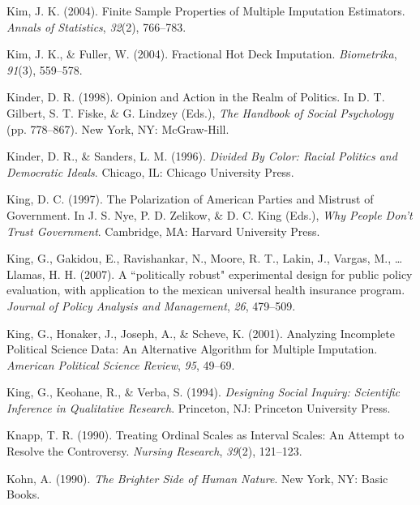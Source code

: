 \documentclass[12pt,econ]{sources/authesis}
\begin{document}
\leavevmode\hypertarget{ref-kim_2004_finite}{}%
Kim, J. K. (2004). Finite Sample Properties of Multiple Imputation Estimators. \emph{Annals of Statistics}, \emph{32}(2), 766--783.

\leavevmode\hypertarget{ref-kim_2004_fractional}{}%
Kim, J. K., \& Fuller, W. (2004). Fractional Hot Deck Imputation. \emph{Biometrika}, \emph{91}(3), 559--578.

\leavevmode\hypertarget{ref-kinder_1998_opinion}{}%
Kinder, D. R. (1998). Opinion and Action in the Realm of Politics. In D. T. Gilbert, S. T. Fiske, \& G. Lindzey (Eds.), \emph{The Handbook of Social Psychology} (pp. 778--867). New York, NY: McGraw-Hill.

\leavevmode\hypertarget{ref-kinder_1996_divided}{}%
Kinder, D. R., \& Sanders, L. M. (1996). \emph{Divided By Color: Racial Politics and Democratic Ideals}. Chicago, IL: Chicago University Press.

\leavevmode\hypertarget{ref-king_polarization_1997}{}%
King, D. C. (1997). The Polarization of American Parties and Mistrust of Government. In J. S. Nye, P. D. Zelikow, \& D. C. King (Eds.), \emph{Why People Don't Trust Government}. Cambridge, MA: Harvard University Press.

\leavevmode\hypertarget{ref-king_a-politically_2007}{}%
King, G., Gakidou, E., Ravishankar, N., Moore, R. T., Lakin, J., Vargas, M., \ldots{} Llamas, H. H. (2007). A ``politically robust" experimental design for public policy evaluation, with application to the mexican universal health insurance program. \emph{Journal of Policy Analysis and Management}, \emph{26}, 479--509.

\leavevmode\hypertarget{ref-king_2001_analyzing}{}%
King, G., Honaker, J., Joseph, A., \& Scheve, K. (2001). Analyzing Incomplete Political Science Data: An Alternative Algorithm for Multiple Imputation. \emph{American Political Science Review}, \emph{95}, 49--69.

\leavevmode\hypertarget{ref-king_designing_1994}{}%
King, G., Keohane, R., \& Verba, S. (1994). \emph{Designing Social Inquiry: Scientific Inference in Qualitative Research}. Princeton, NJ: Princeton University Press.

\leavevmode\hypertarget{ref-knapp_1990_treating}{}%
Knapp, T. R. (1990). Treating Ordinal Scales as Interval Scales: An Attempt to Resolve the Controversy. \emph{Nursing Research}, \emph{39}(2), 121--123.

\leavevmode\hypertarget{ref-kohn_brighter_1990}{}%
Kohn, A. (1990). \emph{The Brighter Side of Human Nature}. New York, NY: Basic Books.
\end{document}
